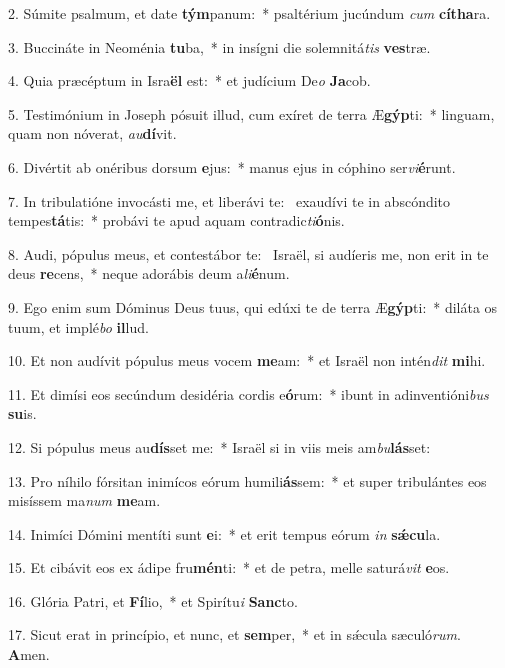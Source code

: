 2. Súmite psalmum, et date \textbf{tým}panum:~*  psaltérium jucúndum \textit{cum} \textbf{cí}\textbf{tha}ra.\

3. Buccináte in Neoménia \textbf{tu}ba,~*  in insígni die solemnitá\textit{tis} \textbf{ves}træ.\

4. Quia præcéptum in Isra\textbf{ël} est:~*  et judícium De\textit{o} \textbf{Ja}cob.\

5. Testimónium in Joseph pósuit illud, cum exíret de terra Æ\textbf{gýp}ti:~*  linguam, quam non nóverat, \textit{au}\textbf{dí}vit.\

6. Divértit ab onéribus dorsum \textbf{e}jus:~*  manus ejus in cóphino ser\textit{vi}\textbf{é}runt.\

7. In tribulatióne invocásti me, et liberávi te: \dag\  exaudívi te in abscóndito tempes\textbf{tá}tis:~*  probávi te apud aquam contradic\textit{ti}\textbf{ó}nis.\

8. Audi, pópulus meus, et contestábor te: \dag\  Israël, si audíeris me, non erit in te deus \textbf{re}cens,~*  neque adorábis deum a\textit{li}\textbf{é}num.\

9. Ego enim sum Dóminus Deus tuus, qui edúxi te de terra Æ\textbf{gýp}ti:~*  diláta os tuum, et implé\textit{bo} \textbf{il}lud.\

10. Et non audívit pópulus meus vocem \textbf{me}am:~*  et Israël non intén\textit{dit} \textbf{mi}hi.\

11. Et dimísi eos secúndum desidéria cordis e\textbf{ó}rum:~*  ibunt in adinventióni\textit{bus} \textbf{su}is.\

12. Si pópulus meus au\textbf{dís}set me:~*  Israël si in viis meis am\textit{bu}\textbf{lás}set:\

13. Pro níhilo fórsitan inimícos eórum humili\textbf{ás}sem:~*  et super tribulántes eos misíssem ma\textit{num} \textbf{me}am.\

14. Inimíci Dómini mentíti sunt \textbf{e}i:~*  et erit tempus eórum \textit{in} \textbf{sǽ}\textbf{cu}la.\

15. Et cibávit eos ex ádipe fru\textbf{mén}ti:~*  et de petra, melle saturá\textit{vit} \textbf{e}os.\

16. Glória Patri, et \textbf{Fí}lio,~*  et Spirítu\textit{i} \textbf{Sanc}to.\

17. Sicut erat in princípio, et nunc, et \textbf{sem}per,~*  et in sǽcula sæculó\textit{rum}. \textbf{A}men.\

